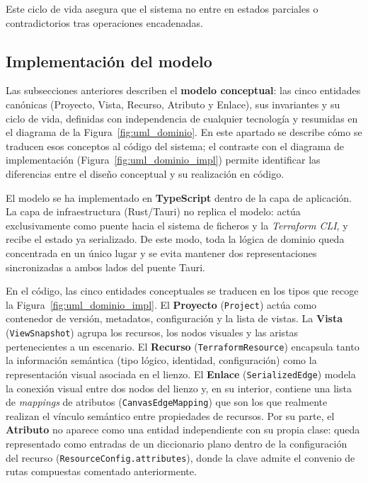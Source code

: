 \documentclass{article}
\begin{document}
{        \justify
        Este ciclo de vida asegura que el sistema no entre en estados parciales o
        contradictorios tras operaciones encadenadas.

        \subsection{Implementación del modelo}
        \label{sec:modelo_dominio_impl}
        \justify
        Las subsecciones anteriores describen el \textbf{modelo conceptual}: las cinco
        entidades canónicas (Proyecto, Vista, Recurso, Atributo y Enlace), sus
        invariantes y su ciclo de vida, definidas con independencia de cualquier
        tecnología y resumidas en el diagrama de la Figura~\ref{fig:uml_dominio}.
        En este apartado se describe cómo se traducen esos conceptos al código
        del sistema; el contraste con el diagrama de implementación
        (Figura~\ref{fig:uml_dominio_impl}) permite identificar las diferencias
        entre el diseño conceptual y su realización en código.

        \justify
        El modelo se ha implementado en \textbf{TypeScript} dentro de
        la capa de aplicación. La capa de infraestructura (Rust/Tauri) no replica el
        modelo: actúa exclusivamente como puente hacia el sistema de ficheros y la
        \textit{Terraform CLI}, y recibe el estado ya serializado. De este modo,
        toda la lógica de dominio queda concentrada en un único lugar y se evita
        mantener dos representaciones sincronizadas a ambos lados del puente Tauri.

        \justify
        En el código, las cinco entidades conceptuales se traducen en los tipos que
        recoge la Figura~\ref{fig:uml_dominio_impl}. El \textbf{Proyecto}
        (\texttt{Project}) actúa como contenedor de versión, metadatos,
        configuración y la lista de vistas. La \textbf{Vista}
        (\texttt{ViewSnapshot}) agrupa los recursos, los nodos visuales y las
        aristas pertenecientes a un escenario. El \textbf{Recurso}
        (\texttt{TerraformResource}) encapsula tanto la información semántica (tipo
        lógico, identidad, configuración) como la representación visual asociada en
        el lienzo. El \textbf{Enlace} (\texttt{SerializedEdge}) modela la
        conexión visual entre dos nodos del lienzo y, en su interior, contiene una
        lista de \textit{mappings} de atributos (\texttt{CanvasEdgeMapping}) que
        son los que realmente realizan el vínculo semántico entre propiedades de
        recursos. Por su parte, el \textbf{Atributo} no aparece como una entidad
        independiente con su propia clase: queda representado como entradas de un
        diccionario plano dentro de la configuración del recurso
        (\texttt{ResourceConfig.attributes}), donde la clave admite el convenio de
        rutas compuestas comentado anteriormente.

}
\end{document}
